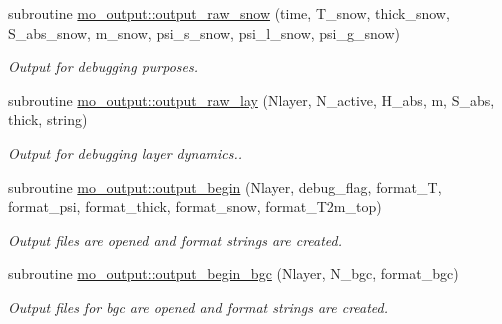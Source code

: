 \begin{DoxyCompactItemize}
subroutine \hyperlink{namespacemo__output_a37683998f084e7c52ae0118b84287f89}{mo\_\-output::output\_\-raw\_\-snow} (time, T\_\-snow, thick\_\-snow, S\_\-abs\_\-snow, m\_\-snow, psi\_\-s\_\-snow, psi\_\-l\_\-snow, psi\_\-g\_\-snow)
\begin{DoxyCompactList}\small\item\em Output for debugging purposes. \item\end{DoxyCompactList}\item 
subroutine \hyperlink{namespacemo__output_a5da23754959960287613e8c86a436fff}{mo\_\-output::output\_\-raw\_\-lay} (Nlayer, N\_\-active, H\_\-abs, m, S\_\-abs, thick, string)
\begin{DoxyCompactList}\small\item\em Output for debugging layer dynamics.. \item\end{DoxyCompactList}\item 
subroutine \hyperlink{namespacemo__output_a2075c870541a3bedcb1478870b200b68}{mo\_\-output::output\_\-begin} (Nlayer, debug\_\-flag, format\_\-T, format\_\-psi, format\_\-thick, format\_\-snow, format\_\-T2m\_\-top)
\begin{DoxyCompactList}\small\item\em Output files are opened and format strings are created. \item\end{DoxyCompactList}\item 
subroutine \hyperlink{namespacemo__output_a6177b5354dfaf78271d92aadef24b94f}{mo\_\-output::output\_\-begin\_\-bgc} (Nlayer, N\_\-bgc, format\_\-bgc)
\begin{DoxyCompactList}\small\item\em Output files for bgc are opened and format strings are created. \item\end{DoxyCompactList}\end{DoxyCompactItemize}
